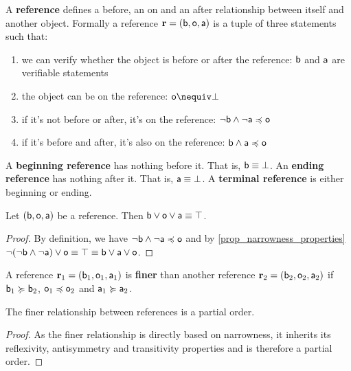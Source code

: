 \documentclass[11pt,letterpaper,fleqn]{memoir} %
\begin{document}
\begin{mathSection}
\begin{defn}
	A \textbf{reference} defines a before, an on and an after relationship between itself and another object. Formally a reference $\refStmt = ( \stmt[b], \stmt[o], \stmt[a] )$ is a tuple of three statements such that:
	\begin{enumerate}
		\item we can verify whether the object is before or after the reference: $\stmt[b]$ and $\stmt[a]$ are verifiable statements
		\item the object can be on the reference: $\stmt[o] \nequiv \contradiction$
		\item if it's not before or after, it's on the reference: $\NOT \stmt[b] \AND \NOT \stmt[a] \narrower \stmt[o]$
		\item if it's before and after, it's also on the reference: $\stmt[b] \AND \stmt[a] \narrower \stmt[o]$
	\end{enumerate}
A \textbf{beginning reference} has nothing before it. That is, $\stmt[b] \equiv \contradiction$. An \textbf{ending reference} has nothing after it. That is, $\stmt[a] \equiv \contradiction$. A \textbf{terminal reference} is either beginning or ending.
\end{defn}
\begin{coro}
	Let $(\stmt[b], \stmt[o], \stmt[a])$ be a reference. Then $\stmt[b] \OR \stmt[o] \OR \stmt[a] \equiv \tautology$.
\end{coro}
\begin{proof}
	By definition, we have $\NOT \stmt[b] \AND \NOT \stmt[a] \narrower \stmt[o]$ and by \ref{prop_narrowness_properties} $\NOT (\NOT \stmt[b] \AND \NOT \stmt[a]) \OR \stmt[o] \equiv \tautology \equiv \stmt[b] \OR \stmt[a] \OR \stmt[o]$.
\end{proof}
\begin{defn}\label{3_def_reference}
	A reference $\refStmt_1 = (\stmt[b]_1, \stmt[o]_1, \stmt[a]_1)$ is \textbf{finer} than another reference $\refStmt_2 = (\stmt[b]_2, \stmt[o]_2, \stmt[a]_2)$ if $\stmt[b]_1 \broader \stmt[b]_2$, $\stmt[o]_1 \narrower \stmt[o]_2$ and $\stmt[a]_1 \broader \stmt[a]_2$.
\end{defn}
\begin{coro}
	The finer relationship between references is a partial order.
\end{coro}
\begin{proof}
	As the finer relationship is directly based on narrowness, it inherits its reflexivity, antisymmetry and transitivity properties and is therefore a partial order.

\end{proof}
\end{mathSection}
\end{document}

